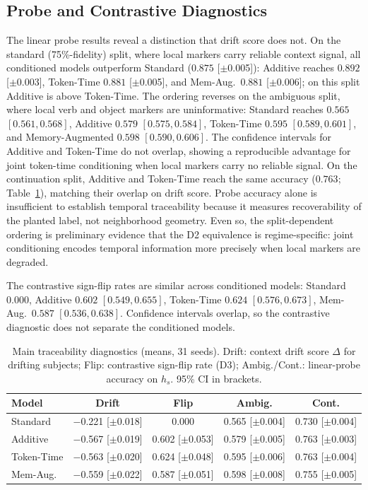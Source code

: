 \documentclass[runningheads]{llncs}
\begin{document}
\subsection{Probe and Contrastive Diagnostics}
The linear probe results reveal a distinction that drift score does not.
On the standard (75\%-fidelity) split, where local markers carry reliable
context signal, all conditioned models outperform Standard
(\(0.875\) [\(\pm\)0.005]): Additive reaches \(0.892\) [\(\pm\)0.003],
Token-Time \(0.881\) [\(\pm\)0.005], and Mem-Aug.\ \(0.881\) [\(\pm\)0.006];
on this split Additive is above Token-Time. The ordering reverses on the
ambiguous split, where local verb and object markers are uninformative: Standard
reaches \(0.565\) \([0.561, 0.568]\), Additive \(0.579\) \([0.575, 0.584]\),
Token-Time \(0.595\) \([0.589, 0.601]\), and Memory-Augmented \(0.598\)
\([0.590, 0.606]\). The confidence intervals for Additive and Token-Time do not
overlap, showing a reproducible advantage for joint token-time conditioning when
local markers carry no reliable signal. On the continuation split,
Additive and Token-Time reach the same accuracy (\(0.763\); Table~\ref{tab:main-results}),
matching their overlap on drift score. Probe accuracy alone is insufficient to establish temporal traceability because
it measures recoverability of the planted label, not neighborhood geometry.
Even so, the split-dependent ordering is preliminary evidence that the D2
equivalence is regime-specific: joint conditioning encodes temporal information
more precisely when local markers are degraded.

The contrastive sign-flip rates are similar across conditioned models: Standard
\(0.000\), Additive \(0.602\) \([0.549, 0.655]\), Token-Time \(0.624\)
\([0.576, 0.673]\), Mem-Aug.\ \(0.587\) \([0.536, 0.638]\). Confidence
intervals overlap, so the contrastive diagnostic does not separate the
conditioned models.
\begin{table}[t]
\caption{Main traceability diagnostics (means, 31 seeds). Drift: context drift
score \(\Delta\) for drifting subjects; Flip: contrastive sign-flip rate (D3);
Ambig./Cont.: linear-probe accuracy on \(h_s\). 95\% CI in brackets.}
\label{tab:main-results}
\centering
\scriptsize
\renewcommand{\arraystretch}{0.88}
\setlength{\tabcolsep}{4pt}
\begin{tabular}{lcccc}
\toprule
\textbf{Model} & \textbf{Drift} & \textbf{Flip} & \textbf{Ambig.} & \textbf{Cont.} \\
\midrule
Standard & $-$0.221 [$\pm$0.018] & 0.000 & 0.565 [$\pm$0.004] & 0.730 [$\pm$0.004] \\
Additive & $-$0.567 [$\pm$0.019] & 0.602 [$\pm$0.053] & 0.579 [$\pm$0.005] & 0.763 [$\pm$0.003] \\
Token-Time    & $-$0.563 [$\pm$0.020] & 0.624 [$\pm$0.048] & 0.595 [$\pm$0.006] & 0.763 [$\pm$0.004] \\
Mem-Aug. & $-$0.559 [$\pm$0.022] & 0.587 [$\pm$0.051] & 0.598 [$\pm$0.008] & 0.755 [$\pm$0.005] \\
\bottomrule
\end{tabular}
\end{table}
\end{document}

